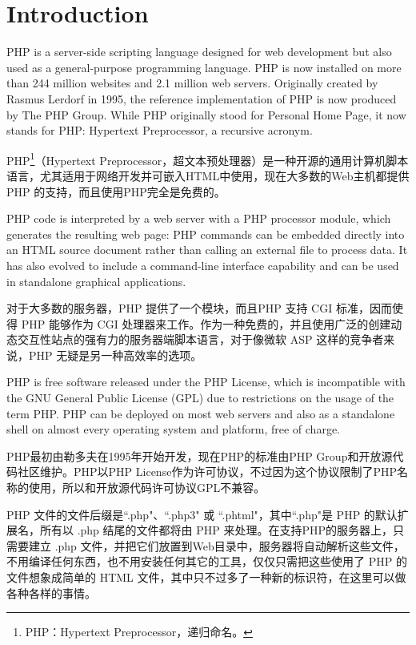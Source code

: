 \part{Introduction}

PHP\cite{php_wiki} is a server-side scripting language designed for web development but also used as a general-purpose programming language. PHP is now installed on more than 244 million websites and 2.1 million web servers. Originally created by Rasmus Lerdorf in 1995, the reference implementation of PHP is now produced by The PHP Group. While PHP originally stood for Personal Home Page, it now stands for PHP: Hypertext Preprocessor, a recursive acronym.

PHP\footnote{PHP：Hypertext Preprocessor，递归命名。}（Hypertext Preprocessor，超文本预处理器）是一种开源的通用计算机脚本语言，尤其适用于网络开发并可嵌入HTML中使用，现在大多数的Web主机都提供 PHP 的支持，而且使用PHP完全是免费的。

PHP code is interpreted by a web server with a PHP processor module, which generates the resulting web page: PHP commands can be embedded directly into an HTML source document rather than calling an external file to process data. It has also evolved to include a command-line interface capability and can be used in standalone graphical applications.

对于大多数的服务器，PHP 提供了一个模块，而且PHP 支持 CGI 标准，因而使得 PHP 能够作为 CGI 处理器来工作。作为一种免费的，并且使用广泛的创建动态交互性站点的强有力的服务器端脚本语言，对于像微软 ASP 这样的竞争者来说，PHP 无疑是另一种高效率的选项。

PHP is free software released under the PHP License, which is incompatible with the GNU General Public License (GPL) due to restrictions on the usage of the term PHP. PHP can be deployed on most web servers and also as a standalone shell on almost every operating system and platform, free of charge.



PHP最初由勒多夫在1995年开始开发，现在PHP的标准由PHP Group和开放源代码社区维护。PHP以PHP License作为许可协议，不过因为这个协议限制了PHP名称的使用，所以和开放源代码许可协议GPL不兼容。

PHP 文件的文件后缀是``.php"、``.php3" 或 ``.phtml"，其中``.php"是 PHP 的默认扩展名，所有以 .php 结尾的文件都将由 PHP 来处理。在支持PHP的服务器上，只需要建立 .php 文件，并把它们放置到Web目录中，服务器将自动解析这些文件，不用编译任何东西，也不用安装任何其它的工具，仅仅只需把这些使用了 PHP 的文件想象成简单的 HTML 文件，其中只不过多了一种新的标识符，在这里可以做各种各样的事情。

